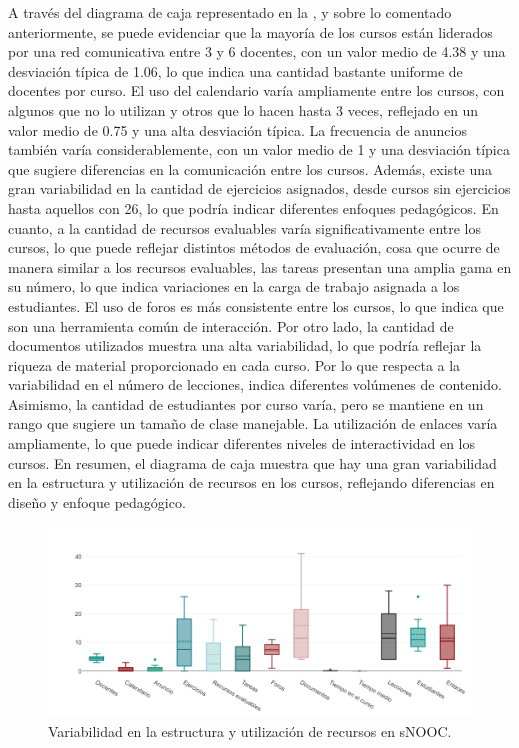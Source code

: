 A través del diagrama de caja representado en la , y sobre lo
comentado anteriormente, se puede evidenciar que la mayoría de los
cursos están liderados por una red comunicativa entre 3 y 6 docentes,
con un valor medio de 4.38 y una desviación típica de 1.06, lo que
indica una cantidad bastante uniforme de docentes por curso. El uso del
calendario varía ampliamente entre los cursos, con algunos que no lo
utilizan y otros que lo hacen hasta 3 veces, reflejado en un valor medio
de 0.75 y una alta desviación típica. La frecuencia de anuncios también
varía considerablemente, con un valor medio de 1 y una desviación típica
que sugiere diferencias en la comunicación entre los cursos. Además,
existe una gran variabilidad en la cantidad de ejercicios asignados,
desde cursos sin ejercicios hasta aquellos con 26, lo que podría indicar
diferentes enfoques pedagógicos. En cuanto, a la cantidad de recursos
evaluables varía significativamente entre los cursos, lo que puede
reflejar distintos métodos de evaluación, cosa que ocurre de manera
similar a los recursos evaluables, las tareas presentan una amplia gama
en su número, lo que indica variaciones en la carga de trabajo asignada
a los estudiantes. El uso de foros es más consistente entre los cursos,
lo que indica que son una herramienta común de interacción. Por otro
lado, la cantidad de documentos utilizados muestra una alta
variabilidad, lo que podría reflejar la riqueza de material
proporcionado en cada curso. Por lo que respecta a la variabilidad en el
número de lecciones, indica diferentes volúmenes de contenido. Asimismo,
la cantidad de estudiantes por curso varía, pero se mantiene en un rango
que sugiere un tamaño de clase manejable. La utilización de enlaces
varía ampliamente, lo que puede indicar diferentes niveles de
interactividad en los cursos. En resumen, el diagrama de caja muestra
que hay una gran variabilidad en la estructura y utilización de recursos
en los cursos, reflejando diferencias en diseño y enfoque pedagógico.
	
\begin{figure}[htbp]
\centering
\begin{minipage}{.85\textwidth}
\caption{Variabilidad en la estructura y utilización de recursos en sNOOC.}
\label{fig-12}
\includegraphics[width=\textwidth]{Imagem12.png}
\end{minipage}
\end{figure}
	
